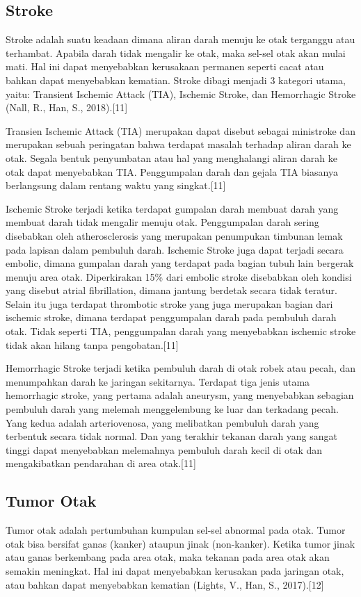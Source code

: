\subsection{Stroke}
Stroke adalah suatu keadaan dimana aliran darah menuju ke otak terganggu atau terhambat. Apabila darah tidak mengalir ke otak, maka sel-sel otak akan mulai mati. Hal ini dapat menyebabkan kerusakaan permanen seperti cacat atau bahkan dapat menyebabkan kematian. Stroke dibagi menjadi 3 kategori utama, yaitu: Transient Ischemic Attack (TIA), Ischemic Stroke, dan Hemorrhagic Stroke (Nall, R., Han, S., 2018).[11]

Transien Ischemic Attack (TIA) merupakan dapat disebut sebagai ministroke dan merupakan sebuah peringatan bahwa terdapat masalah terhadap aliran darah ke otak. Segala bentuk penyumbatan atau hal yang menghalangi aliran darah ke otak dapat menyebabkan TIA. Penggumpalan darah dan gejala TIA biasanya berlangsung dalam rentang waktu yang singkat.[11]

Ischemic Stroke terjadi ketika terdapat gumpalan darah membuat darah yang membuat darah tidak mengalir menuju otak. Penggumpalan darah sering disebabkan oleh atherosclerosis yang merupakan penumpukan timbunan lemak pada lapisan dalam pembuluh darah. Ischemic Stroke juga dapat terjadi secara embolic, dimana gumpalan darah yang terdapat pada bagian tubuh lain bergerak menuju area otak. Diperkirakan 15\% dari embolic stroke disebabkan oleh kondisi yang disebut atrial fibrillation, dimana jantung berdetak secara tidak teratur. Selain itu juga terdapat thrombotic stroke yang juga merupakan bagian dari ischemic stroke, dimana terdapat penggumpalan darah pada pembuluh darah otak. Tidak seperti TIA, penggumpalan darah yang menyebabkan ischemic stroke tidak akan hilang tanpa pengobatan.[11]

Hemorrhagic Stroke terjadi ketika pembuluh darah di otak robek atau pecah, dan menumpahkan darah ke jaringan sekitarnya. Terdapat tiga jenis utama hemorrhagic stroke, yang pertama adalah aneurysm, yang menyebabkan sebagian pembuluh darah yang melemah menggelembung ke luar dan terkadang pecah. Yang kedua adalah arteriovenosa, yang melibatkan pembuluh darah yang terbentuk secara tidak normal. Dan yang terakhir tekanan darah yang sangat tinggi dapat menyebabkan melemahnya pembuluh darah kecil di otak dan mengakibatkan pendarahan di area otak.[11]

\subsection{Tumor Otak}
Tumor otak adalah pertumbuhan kumpulan sel-sel abnormal pada otak. Tumor otak bisa bersifat ganas (kanker) ataupun jinak (non-kanker). Ketika tumor jinak atau ganas berkembang pada area otak, maka tekanan pada area otak akan semakin meningkat. Hal ini dapat menyebabkan kerusakan pada jaringan otak, atau bahkan dapat menyebabkan kematian (Lights, V., Han, S., 2017).[12]

